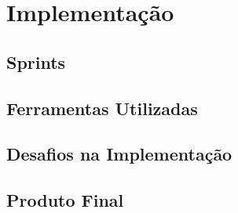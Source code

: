 \chapter{Implementação}
\label{sec:implementacao}


\section{Sprints}
\label{sec:sprints}

\section{Ferramentas Utilizadas}
\label{sec:ferramentas}


\section{Desafios na Implementação}
\label{sec:dificuldades}

\section{Produto Final}
\label{sec:finalPro}

\blankpage

\glsresetall

